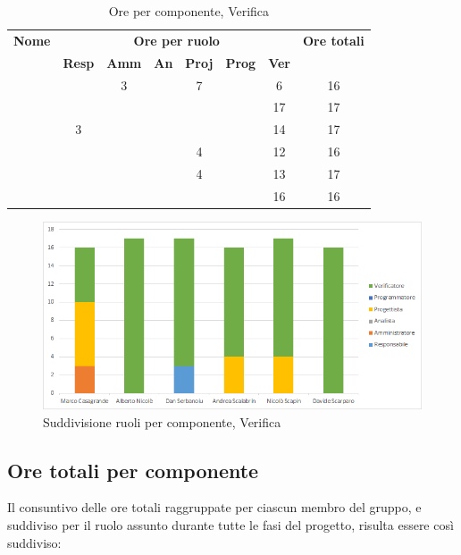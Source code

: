 \begin{table}[H]
	\begin{center}
		\begin{tabular}{|c|c|c|c|c|c|c|c|}
			\hline
			\textbf{Nome} & \multicolumn{6}{c|}{\textbf{Ore per ruolo}} & \textbf{Ore totali} \\\cline{2-7}
			& \textbf{Resp} & \textbf{Amm} & \textbf{An} & \textbf{Proj} & \textbf{Prog} & \textbf{Ver} & \\
			\hline
			\MC			&		&	3	&		&	7	&		&	6	&	16	\\
			\hline
			\AN			&		&		&		&	 	&		&	17	& 	17	\\
			\hline
			\DAN		&	3	&		&		&		&		&	14	&	17	\\
			\hline
			\AS			&		&	 	&	 	&	4	&	 	& 	12	&	16	\\
			\hline
			\NS 		&		&		&		&	4	&		& 	13	&	17	\\
			\hline
			\DS			& 		&		&		&		&		&	16	&	16	\\
			\hline
		\end{tabular}
	\end{center}
	\caption{Ore per componente, Verifica}
\end{table}

\begin{figure}[H]
	\centering
	\includegraphics[scale=0.6]{img/6-5.png}
	\caption{Suddivisione ruoli per componente, Verifica}
\end{figure}

\subsection{Ore totali per componente}
Il consuntivo delle ore totali raggruppate per ciascun membro del gruppo, e suddiviso per il ruolo assunto durante tutte le fasi del progetto, risulta essere così suddiviso:

